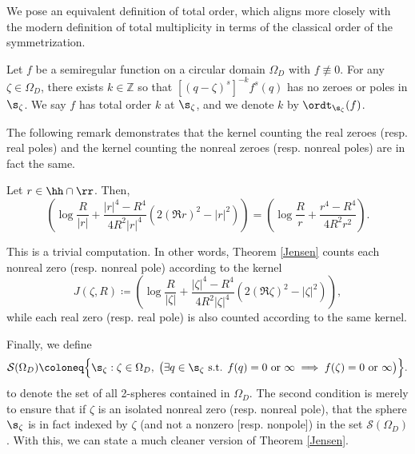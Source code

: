 \documentclass{amsart}
\begin{document}
We pose an equivalent definition of total order, which aligns more closely with the modern definition of total multiplicity in terms of the classical order of the symmetrization. 

\begin{defin}\label{totalOrderr}
    Let $f$ be a semiregular function on a circular domain $\Omega_D$ with $f\not\equiv0$. For any $\zeta\in\Omega_D$, there exists $k\in\mathbb Z$ so that $[(q-\zeta)^s]^{-k}f^s(q)$ has no zeroes or poles in $\s_\zeta$. We say $f$ has total order $k$ at $\s_\zeta$, and we denote $k$ by $\ordt_{\s_\zeta}(f)$. 
\end{defin}

The following remark demonstrates that the kernel counting the real zeroes (resp. real poles) and the kernel counting the nonreal zeroes (resp. nonreal poles) are in fact the same. 

\begin{remark}
    Let $r\in\hh\cap\rr$. Then, \[\left(\log\frac{R}{|r|}+\frac{|r|^4-R^4}{4R^2|r|^4}\left(2(\Re r)^2-|r|^2\right)\right)=\left(\log\frac{R}{r}+\frac{r^4-R^4}{4R^2r^2}\right).\]
\end{remark}

This is a trivial computation. In other words, Theorem \ref{Jensen} counts each nonreal zero (resp. nonreal pole) according to the kernel \[J(\zeta,R)\coloneq\left(\log\frac{R}{|\zeta|}+\frac{|\zeta|^4-R^4}{4R^2|\zeta|^4}\left(2(\Re \zeta)^2-|\zeta|^2\right)\right),\] while each real zero (resp. real pole) is also counted according to the same kernel. 

Finally, we define \[
\mathcal S(\Omega_D) \coloneq 
\Bigl\{ \s_\zeta : \zeta \in \Omega_D, \;\bigl(\exists q \in \s_\zeta \text{ s.t. } f(q) = 0 \text{ or } \infty \implies f(\zeta) = 0 \text{ or } \infty\bigr) \Bigr\}.
\]
to denote the set of all 2-spheres contained in $\Omega_D$. The second condition is merely to ensure that if $\zeta$ is an isolated nonreal zero (resp. nonreal pole), that the sphere $\s_\zeta$ is in fact indexed by $\zeta$ (and not a nonzero [resp. nonpole]) in the set $\mathcal{S}(\Omega_D)$. With this, we can state a much cleaner version of Theorem \ref{Jensen}. 
\end{document}
